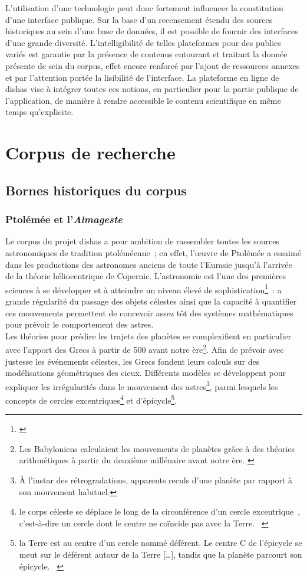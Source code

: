 \documentclass[a4paper,12pt,twoside]{book}
\newcommand{\clearemptydoublepage}{\newpage{\pagestyle{empty}\cleardoublepage}}
\newcommand{\p}{[\ldots]\xspace}
\newcommand{\g}[1]{\og#1~\fg}
\newcommand{\dishas}{\gls{dishas}\xspace}
\begin{document}
L'utilisation d'une technologie peut donc fortement influencer la constitution d'une interface publique. Sur la base d'un recensement étendu des sources historiques au sein d'une base de données, il est possible de fournir des interfaces d'une grande diversité. L'intelligibilité de telles plateformes pour des publics variés est garantie par la présence de contenus entourant et traitant la donnée présente de sein du corpus, effet encore renforcé par l'ajout de ressources annexes et par l'attention portée la lisibilité de l'interface. La plateforme en ligne de \dishas vise à intégrer toutes ces notions, en particulier pour la partie publique de l'application, de manière à rendre accessible le contenu scientifique en même temps qu'explicite.

\clearemptydoublepage

\chapter{Corpus de recherche}
	\section{Bornes historiques du corpus}
		\subsection{Ptolémée et l'\emph{Almageste}}
Le corpus du projet \dishas a pour ambition de rassembler toutes les sources astronomiques de tradition ptoléméenne~; en effet, l'œuvre de Ptolémée a essaimé dans les productions des astronomes anciens de toute l'Eurasie jusqu'à l'arrivée de la théorie héliocentrique de Copernic. L'astronomie est l'une des premières sciences à se développer et à atteindre un niveau élevé de sophistication\footnote{\cite{evansHistoryAstronomy}}~: a grande régularité du passage des objets célestes ainsi que la capacité à quantifier ces mouvements permettent de concevoir assez tôt des systèmes mathématiques pour prévoir le comportement des astres.\\

Les théories pour prédire les trajets des planètes se complexifient en particulier avec l'apport des Grecs à partir de 500 avant notre ère\footnote{Les Babyloniens calculaient les mouvements de planètes grâce à des théories arithmétiques à partir du deuxième millénaire avant notre ère. \cite{evansHistoryAstronomy}}. Afin de prévoir avec justesse les événements célestes, les Grecs fondent leurs calculs sur des modélisations géométriques des cieux. Différents modèles se développent pour expliquer les irrégularités dans le mouvement des astres\footnote{À l'instar des rétrogradations, apparents reculs d'une planète par rapport à son mouvement habituel.}, parmi lesquels les concepts de cercles excentriques\footnote{\g{le corps céleste se déplace le long de la circonférence d'un cercle \g{excentrique}, c'est-à-dire un cercle dont le centre ne coïncide pas avec la Terre.} \cite{bessouLumieresUniversHistoire}} et d'épicycle\footnote{\g{la Terre est au centre d'un cercle nommé déférent. Le centre C de l'épicycle se meut sur le déférent autour de la Terre \p, tandis que la planète parcourt son épicycle.} \cite{bessouLumieresUniversHistoire}}.
\end{document}

